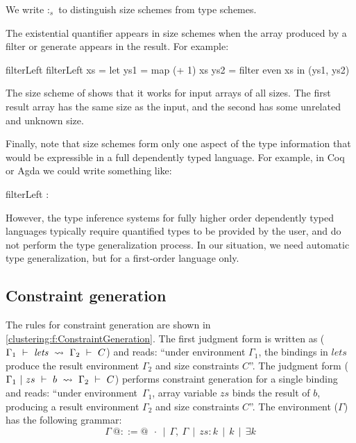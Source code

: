We write $:_s$ to distinguish size schemes from type schemes.

The existential quantifier appears in size schemes when the array produced by a filter or generate appears in the result.
For example:

\begin{haskell}
filterLeft %
filterLeft xs
  = let ys1 = map (+ 1)   xs
        ys2 = filter even xs
    in (ys1, ys2)
\end{haskell}

The size scheme of \Hs@filterLeft@ shows that it works for input arrays of all sizes.
The first result array has the same size as the input, and the second has some unrelated and unknown size.

Finally, note that size schemes form only one aspect of the type information that would be expressible in a full dependently typed language.
For example, in Coq or Agda we could write something like:

\begin{haskell}
filterLeft : %
\end{haskell}

However, the type inference systems for fully higher order dependently typed languages typically require quantified types to be provided by the user, and do not perform the type generalization process.
In our situation, we need automatic type generalization, but for a first-order language only.



\subsection{Constraint generation}
The rules for constraint generation are shown in \cref{clustering:f:ConstraintGeneration}.
The first judgment form is written as ($\Gamma_1 ~\vdash~ \textit{lets} ~\leadsto~ \Gamma_2 ~\vdash~ C$) and reads: ``under environment $\Gamma_1$, the bindings in $\textit{lets}$ produce the result environment $\Gamma_2$ and size constraints $C$''.
The judgment form ($\Gamma_1 ~|~ zs ~\vdash~ b ~\leadsto~ \Gamma_2 ~\vdash~ C$) performs constraint generation for a single binding and reads: ``under environment~$\Gamma_1$, array variable $zs$ binds the result of $b$, producing a result environment $\Gamma_2$ and size constraints $C$''.
The environment ($\Gamma$) has the following grammar:
$$
\Gamma~ @::=@ ~~\cdot ~~|~~ \Gamma,~ \Gamma ~~|~~ zs : k ~~|~~ k ~~|~~ \exists k
$$


